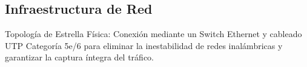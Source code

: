 \subsection{Infraestructura de Red}
Topología de Estrella Física: Conexión mediante un Switch Ethernet y cableado UTP Categoría 5e/6 para eliminar la inestabilidad de redes inalámbricas y garantizar la captura íntegra del tráfico.